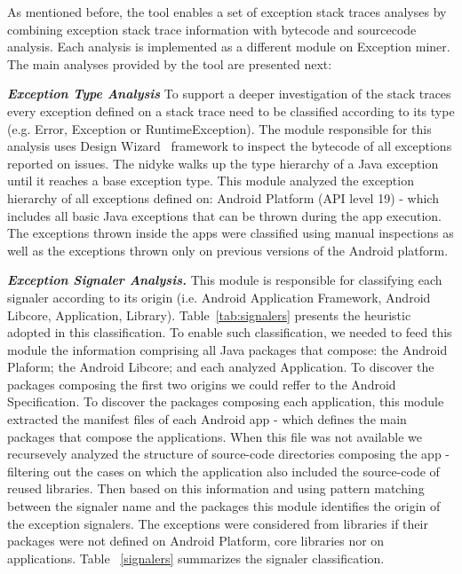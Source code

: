 \documentclass[conference]{IEEEtran}
\begin{document}
As mentioned before, the tool enables a set of exception stack traces analyses by combining exception stack 
trace information with bytecode and sourcecode analysis. Each analysis is implemented as a different module 
on Exception miner. The main analyses provided by the tool are presented next:

\emph{\textbf{Exception Type Analysis}} To support a deeper investigation of the 
stack traces every exception defined on a stack trace need to be classified according to its type
(e.g. Error, Exception or RuntimeException). The module responsible for this analysis 
uses Design Wizard~\cite{Brunet09} framework to inspect the bytecode of all exceptions reported on issues.
The nidyke walks up the type hierarchy of a Java exception until it reaches a base exception type.
This module analyzed the exception hierarchy of all exceptions defined on:
Android Platform (API level 19) - which includes all basic Java exceptions that 
can be thrown during the app execution. The exceptions thrown inside the apps
were classified using manual inspections as well as the exceptions thrown only
on previous versions of the Android platform.

\emph{\textbf{Exception Signaler Analysis.}}
This module is responsible for classifying each signaler according 
to its origin (i.e. Android Application Framework, Android Libcore, Application, Library). 
Table~\ref{tab:signalers} presents the heuristic adopted in this classification.
To enable such classification, we needed to feed this module the information
comprising all Java packages that compose: the Android Plaform;
 the Android Libcore; and each analyzed Application. 
To discover the packages composing the first two origins
we could reffer to the Android Specification.
To discover the packages composing each application, this module 
extracted the manifest files of each Android app
 - which defines the main packages that compose the applications.
 When this file was not available we recursevely analyzed the 
structure of source-code directories composing the app
- filtering out the cases on which the application 
also included the source-code of reused libraries.
Then based on this information and using pattern matching 
between the signaler name and the packages this module identifies 
the origin of the exception signalers. The exceptions were considered
 from libraries if their packages were not defined 
on Android Platform, core libraries nor on applications.
Table ~\ref{signalers} summarizes the signaler classification.
\end{document}
